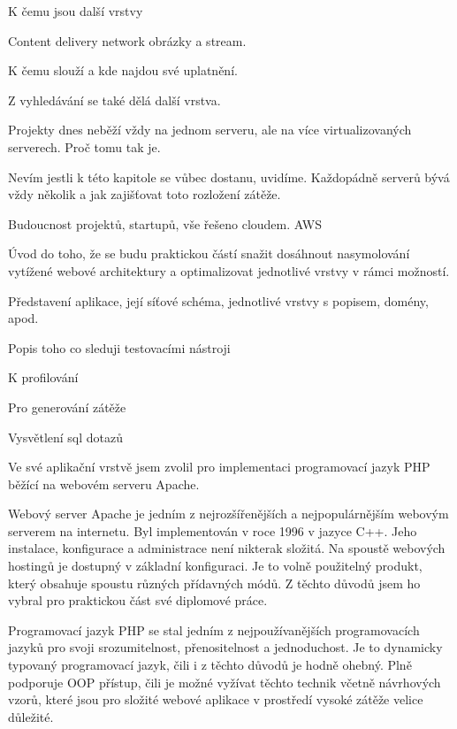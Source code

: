 \documentclass[12pt]{article}
\begin{document}
K čemu jsou další vrstvy

Content delivery network obrázky a stream.

K čemu slouží a kde najdou své uplatnění.

Z vyhledávání se také dělá další vrstva.



Projekty dnes neběží vždy na jednom serveru, ale na více virtualizovaných serverech. Proč tomu tak je.


Nevím jestli k této kapitole se vůbec dostanu, uvidíme. Každopádně serverů bývá vždy několik a jak zajišťovat toto rozložení zátěže.


Budoucnost projektů, startupů, vše řešeno cloudem. AWS




Úvod do toho, že se budu praktickou částí snažit dosáhnout nasymolování vytížené webové architektury a optimalizovat jednotlivé vrstvy v rámci možností.

Představení aplikace, její síťové schéma, jednotlivé vrstvy s popisem, domény, apod.

Popis toho co sleduji testovacími nástroji

K profilování

Pro generování zátěže

Vysvětlení sql dotazů

Ve své aplikační vrstvě jsem zvolil pro implementaci programovací jazyk PHP běžící na webovém serveru Apache.

Webový server Apache je jedním z nejrozšířenějších a nejpopulárnějším webovým serverem na internetu. Byl implementován v roce 1996 v jazyce C++. Jeho instalace, konfigurace a administrace není nikterak složitá. Na spoustě webových hostingů je dostupný v základní konfiguraci. Je to volně použitelný produkt, který obsahuje spoustu různých přídavných módů. Z těchto důvodů jsem ho vybral pro praktickou část své diplomové práce.

Programovací jazyk PHP se stal jedním z nejpoužívanějších programovacích jazyků pro svoji srozumitelnost, přenositelnost a jednoduchost. Je to dynamicky typovaný programovací jazyk, čili i z těchto důvodů je hodně ohebný. Plně podporuje OOP přístup, čili je možné vyžívat těchto technik včetně návrhových vzorů, které jsou pro složité webové aplikace v prostředí vysoké zátěže velice důležité.
\end{document}
